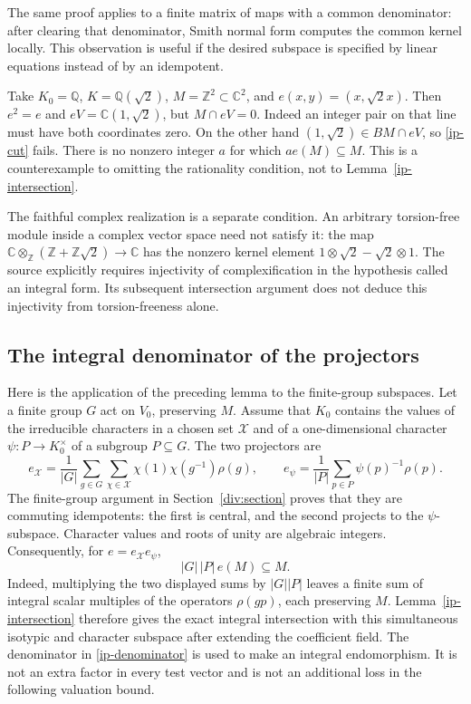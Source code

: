 The same proof applies to a finite matrix of maps with a common
denominator: after clearing that denominator, Smith normal form
computes the common kernel locally. This observation is useful if
the desired subspace is specified by linear equations instead of
by an idempotent.

\begin{example}
Take $K_0=\mathbb Q$, $K=\mathbb Q(\sqrt2)$,
$M=\mathbb Z^2\subset\mathbb C^2$, and
$e(x,y)=(x,\sqrt2x)$. Then $e^2=e$ and
$eV=\mathbb C(1,\sqrt2)$, but $M\cap eV=0$.
Indeed an integer pair on that line must have both coordinates zero.
On the other hand $(1,\sqrt2)\in BM\cap eV$, so
\eqref{ip-cut} fails. There is no nonzero integer $a$ for which
$ae(M)\subseteq M$. This is a counterexample to omitting the
rationality condition, not to Lemma~\ref{ip-intersection}.
\end{example}

The faithful complex realization is a separate condition. An arbitrary
torsion-free module inside a complex vector space need not satisfy it:
the map $\mathbb C\otimes_{\mathbb Z}(\mathbb Z+\mathbb Z\sqrt2)
\to\mathbb C$ has the nonzero kernel element
$1\otimes\sqrt2-\sqrt2\otimes1$. The source explicitly requires
injectivity of complexification in the hypothesis called an integral
form. Its subsequent intersection argument does not deduce this
injectivity from torsion-freeness alone.

\subsection{The integral denominator of the projectors}

Here is the application of the preceding lemma to the finite-group
subspaces. Let a finite group $G$ act on $V_0$, preserving $M$.
Assume that $K_0$ contains the values of the irreducible characters
in a chosen set $\mathcal X$ and of a one-dimensional character
$\psi:P\to K_0^\times$ of a subgroup $P\subseteq G$.
The two projectors are
\[
 e_{\mathcal X}
   =\frac1{|G|}\sum_{g\in G}\sum_{\chi\in\mathcal X}
                 \chi(1)\chi(g^{-1})\rho(g),
 \qquad
 e_\psi=\frac1{|P|}\sum_{p\in P}\psi(p)^{-1}\rho(p).
\]
The finite-group argument in Section~\ref{div:section} proves that
they are commuting idempotents: the first is central, and the second
projects to the $\psi$-subspace. Character values and roots of unity
are algebraic integers. Consequently, for $e=e_{\mathcal X}e_\psi$,
\begin{equation}\label{ip-denominator}
                     |G|\,|P|\,e(M)\subseteq M.
\end{equation}
Indeed, multiplying the two displayed sums by $|G||P|$ leaves
a finite sum of integral scalar multiples of the operators $\rho(gp)$,
each preserving $M$. Lemma~\ref{ip-intersection} therefore gives
the exact integral intersection with this simultaneous isotypic and
character subspace after extending the coefficient field.
The denominator in \eqref{ip-denominator} is used to make an
integral endomorphism. It is not an extra factor in every test
vector and is not an additional loss in the following valuation bound.

